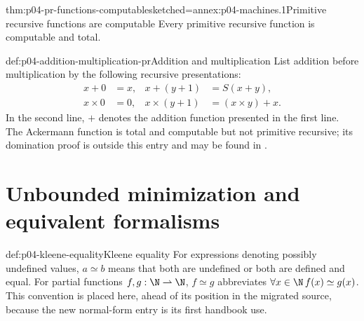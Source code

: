 \begin{hbtheorem}{thm:p04-pr-functions-computable}{sketched=annex:p04-machines.1}{Primitive recursive functions are computable}
Every primitive recursive function is computable and total.
\end{hbtheorem}

\begin{hbexample}{def:p04-addition-multiplication-pr}{Addition and multiplication}
List addition before multiplication by the following recursive presentations:
\[
\begin{aligned}
  x+0&=x, & x+(y+1)&=S(x+y),\\
  x\times0&=0, & x\times(y+1)&=(x\times y)+x.
\end{aligned}
\]
In the second line, \(+\) denotes the addition function presented in the first
line.
The Ackermann function is total and computable but not primitive recursive;
its domination proof is outside this entry and may be found in
\cite{BoolosBurgessJeffrey2007}.
\end{hbexample}

\section[Minimization and Formalisms]{Unbounded minimization and equivalent formalisms}
\label{sec:p04-partial-recursion}

\begin{hbconvention}{def:p04-kleene-equality}{Kleene equality}
For expressions denoting possibly undefined values, \(a\simeq b\) means that
both are undefined or both are defined and equal.  For partial functions
\(f,g:\N\rightharpoonup\N\), \(f\simeq g\) abbreviates
\(\forall x\in\N\,f(x)\simeq g(x)\).  This convention is placed here, ahead
of its position in the migrated source, because the new normal-form entry is
its first handbook use.
\end{hbconvention}

